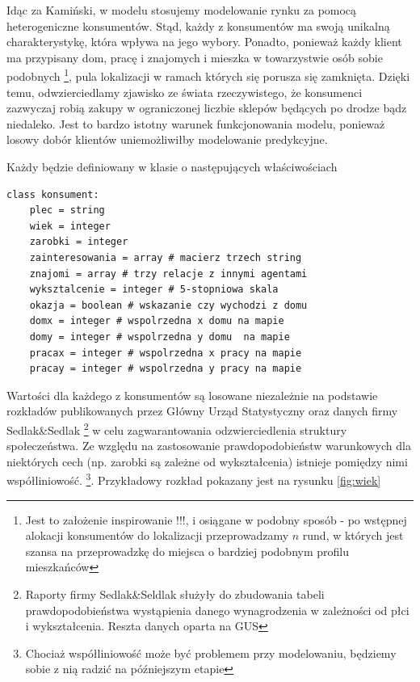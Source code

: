 \documentclass{article}
\begin{document}
Idąc za Kamiński, w modelu stosujemy modelowanie rynku za pomocą heterogeniczne konsumentów. Stąd, każdy z konsumentów ma swoją unikalną charakterystykę, która wpływa na jego wybory. Ponadto, ponieważ każdy klient ma przypisany dom, pracę i znajomych i mieszka w towarzystwie osób sobie podobnych  \footnote{Jest to założenie inspirowanie !!!, i osiągane w podobny sposób - po wstępnej alokacji konsumentów do lokalizacji przeprowadzamy $n$ rund, w których jest szansa na przeprowadzkę do miejsca o bardziej podobnym profilu mieszkańców}, pula lokalizacji w ramach których się porusza się zamknięta. Dzięki temu, odwzierciedlamy zjawisko ze świata rzeczywistego, że konsumenci zazwyczaj robią zakupy w ograniczonej liczbie sklepów będących po drodze bądz niedaleko. Jest to bardzo istotny warunek funkcjonowania modelu, ponieważ losowy dobór klientów uniemożliwiłby modelowanie predykcyjne.

Każdy będzie definiowany w klasie o następujących właściwościach 

\begin{lstlisting}[frame=single]  
class konsument:   
	plec = string
	wiek = integer 
	zarobki = integer 
	zainteresowania = array # macierz trzech string 
	znajomi = array # trzy relacje z innymi agentami
	wyksztalcenie = integer # 5-stopniowa skala 
	okazja = boolean # wskazanie czy wychodzi z domu
	domx = integer # wspolrzedna x domu na mapie
	domy = integer # wspolrzedna y domu  na mapie
	pracax = integer # wspolrzedna x pracy na mapie
	pracay = integer # wspolrzedna y pracy na mapie
\end{lstlisting}

Wartości dla każdego z konsumentów są losowane niezależnie na podstawie rozkładów publikowanych przez Główny Urząd Statystyczny oraz danych firmy Sedlak\&Sedlak \footnote{Raporty firmy Sedlak\&Seldlak służyły do zbudowania tabeli prawdopodobieństwa wystąpienia danego wynagrodzenia w zależności od płci i wykształcenia. Reszta danych oparta na GUS} w celu zagwarantowania odzwierciedlenia struktury społeczeństwa. Ze względu na zastosowanie prawdopodobieństw warunkowych dla niektórych cech (np. zarobki są zależne od wykształcenia) istnieje pomiędzy nimi współliniowość. \footnote{Chociaż współliniowość może być problemem przy modelowaniu, będziemy sobie z nią radzić na późniejszym etapie}. Przykładowy rozkład pokazany jest na rysunku \ref{fig:wiek}
\end{document}
